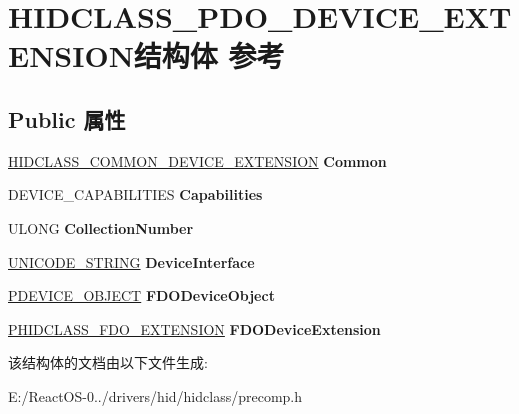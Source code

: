 \hypertarget{struct_h_i_d_c_l_a_s_s___p_d_o___d_e_v_i_c_e___e_x_t_e_n_s_i_o_n}{}\section{H\+I\+D\+C\+L\+A\+S\+S\+\_\+\+P\+D\+O\+\_\+\+D\+E\+V\+I\+C\+E\+\_\+\+E\+X\+T\+E\+N\+S\+I\+O\+N结构体 参考}
\label{struct_h_i_d_c_l_a_s_s___p_d_o___d_e_v_i_c_e___e_x_t_e_n_s_i_o_n}
\subsection*{Public 属性}
\begin{DoxyCompactItemize}
\item 
\mbox{\label{struct_h_i_d_c_l_a_s_s___p_d_o___d_e_v_i_c_e___e_x_t_e_n_s_i_o_n_a420cbca9e1a25c3fd3124237f892822a}} 
\hyperlink{struct_h_i_d_c_l_a_s_s___c_o_m_m_o_n___d_e_v_i_c_e___e_x_t_e_n_s_i_o_n}{H\+I\+D\+C\+L\+A\+S\+S\+\_\+\+C\+O\+M\+M\+O\+N\+\_\+\+D\+E\+V\+I\+C\+E\+\_\+\+E\+X\+T\+E\+N\+S\+I\+ON} {\bfseries Common}
\item 
\mbox{\label{struct_h_i_d_c_l_a_s_s___p_d_o___d_e_v_i_c_e___e_x_t_e_n_s_i_o_n_ae9d7dceb977117e937e1551e7602cb97}} 
D\+E\+V\+I\+C\+E\+\_\+\+C\+A\+P\+A\+B\+I\+L\+I\+T\+I\+ES {\bfseries Capabilities}
\item 
\mbox{\label{struct_h_i_d_c_l_a_s_s___p_d_o___d_e_v_i_c_e___e_x_t_e_n_s_i_o_n_ad7a5a6eca763e772d66ff865eb49abab}} 
U\+L\+O\+NG {\bfseries Collection\+Number}
\item 
\mbox{\label{struct_h_i_d_c_l_a_s_s___p_d_o___d_e_v_i_c_e___e_x_t_e_n_s_i_o_n_afb3182cba1cd795967460ce674bc6b69}} 
\hyperlink{struct___u_n_i_c_o_d_e___s_t_r_i_n_g}{U\+N\+I\+C\+O\+D\+E\+\_\+\+S\+T\+R\+I\+NG} {\bfseries Device\+Interface}
\item 
\mbox{\label{struct_h_i_d_c_l_a_s_s___p_d_o___d_e_v_i_c_e___e_x_t_e_n_s_i_o_n_ada815adb7c89b0bbc08dd2c0dfa06270}} 
\hyperlink{struct___d_e_v_i_c_e___o_b_j_e_c_t}{P\+D\+E\+V\+I\+C\+E\+\_\+\+O\+B\+J\+E\+CT} {\bfseries F\+D\+O\+Device\+Object}
\item 
\mbox{\label{struct_h_i_d_c_l_a_s_s___p_d_o___d_e_v_i_c_e___e_x_t_e_n_s_i_o_n_ae068dd20fbdc0f127b0c900e143852d8}} 
\hyperlink{struct_h_i_d_c_l_a_s_s___f_d_o___e_x_t_e_n_s_i_o_n}{P\+H\+I\+D\+C\+L\+A\+S\+S\+\_\+\+F\+D\+O\+\_\+\+E\+X\+T\+E\+N\+S\+I\+ON} {\bfseries F\+D\+O\+Device\+Extension}
\end{DoxyCompactItemize}


该结构体的文档由以下文件生成\+:\begin{DoxyCompactItemize}
\item 
E\+:/\+React\+O\+S-\/0../drivers/hid/hidclass/precomp.\+h\end{DoxyCompactItemize}
